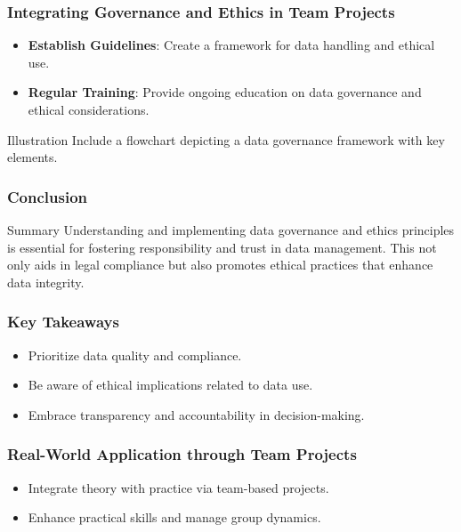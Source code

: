 \documentclass{beamer}
\begin{document}
\begin{frame}[fragile]
    \frametitle{Integrating Governance and Ethics in Team Projects}
    \begin{itemize}
        \item \textbf{Establish Guidelines}: Create a framework for data handling and ethical use.
        \item \textbf{Regular Training}: Provide ongoing education on data governance and ethical considerations.
    \end{itemize}
    \begin{block}{Illustration}
        Include a flowchart depicting a data governance framework with key elements.
    \end{block}
\end{frame}

\begin{frame}[fragile]
    \frametitle{Conclusion}
    \begin{block}{Summary}
        Understanding and implementing data governance and ethics principles is essential for fostering responsibility and trust in data management. This not only aids in legal compliance but also promotes ethical practices that enhance data integrity.
    \end{block}
\end{frame}

\begin{frame}[fragile]
    \frametitle{Key Takeaways}
    \begin{itemize}
        \item Prioritize data quality and compliance.
        \item Be aware of ethical implications related to data use.
        \item Embrace transparency and accountability in decision-making.
    \end{itemize}
\end{frame}

\begin{frame}[fragile]
    \frametitle{Real-World Application through Team Projects}
    \begin{itemize}
        \item Integrate theory with practice via team-based projects.
        \item Enhance practical skills and manage group dynamics.
    \end{itemize}
\end{frame}
\end{document}
